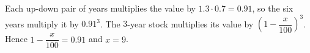 Each up-down pair of years multiplies the value by $1.3\cdot0.7=0.91$, so the six years multiply it by $0.91^3$. The $3$-year stock multiplies its value by $\left(1-\dfrac{x}{100}\right)^3$. Hence $1-\dfrac{x}{100}=0.91$ and $x=\boxed{9}$.
